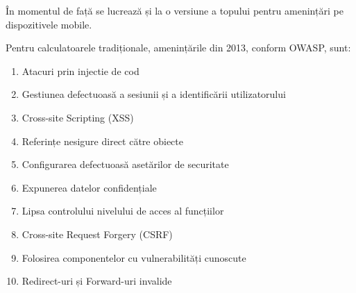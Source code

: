 \documentclass[12pt,a4paper,draft]{article}
\begin{document}
		În momentul de față se lucrează și la o versiune a topului pentru amenințări pe dispozitivele mobile.

		Pentru calculatoarele tradiționale, amenințările din 2013, conform OWASP, sunt:
		\begin{enumerate}
			\item Atacuri prin injectie de cod
			\item Gestiunea defectuoasă a sesiunii și a identificării utilizatorului
			\item Cross-site Scripting (XSS)
			\item Referințe nesigure direct către obiecte
			\item Configurarea defectuoasă asetărilor de securitate
			\item Expunerea datelor confidențiale
			\item Lipsa controlului nivelului de acces al funcțiilor
			\item Cross-site Request Forgery (CSRF)
			\item Folosirea componentelor cu vulnerabilități cunoscute
			\item Redirect-uri și Forward-uri invalide
		\end{enumerate}
		
	
\end{document}
